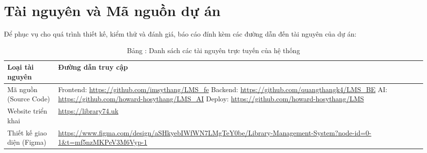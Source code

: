 \newpage
{}
\chapter*{Tài nguyên và Mã nguồn dự án}
\makeatletter
{}
\makeatother
\label{appendix:resources}

Để phục vụ cho quá trình thiết kế, kiểm thử và đánh giá, báo cáo đính kèm các đường dẫn đến tài nguyên của dự án:

\begin{table}[h]
\centering
\renewcommand{\arraystretch}{1.5}
\begin{tabular}{|l|p{10cm}|}
\hline
\textbf{Loại tài nguyên} & \textbf{Đường dẫn truy cập} \\ \hline
Mã nguồn (Source Code) & Frontend: \url{https://github.com/imsythang/LMS_fe} \newline Backend: \url{https://github.com/quangthangk4/LMS_BE} \newline AI: \url{https://github.com/howard-hosythang/LMS_AI} \newline Deploy: \url{https://github.com/howard-hosythang/LMS} \\ \hline
Website triển khai & \url{https://library74.uk} \\ \hline
Thiết kế giao diện (Figma) & \url{https://www.figma.com/design/aSHkyebIWfWN7LMgTeY0be/Library-Management-System?node-id=0-1&t=mf5nzMKPeV3M6Vyp-1} \\ \hline
\end{tabular}
\caption*{Bảng \thetable: Danh sách các tài nguyên trực tuyến của hệ thống}
\makeatletter
{}
\makeatother
\end{table}
